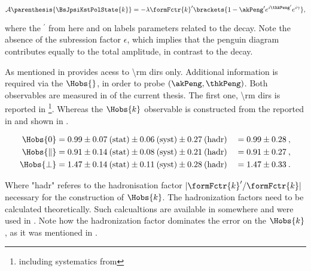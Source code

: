 \begin{equation}
  \mathcal{A} \parenthesis{\BsJpsiKstPolState{k}} = -\lambda \formFctr{k}' \brackets{ 1 - \akPeng' e^{i\thkPeng'} e^{i\gamma} },
  \label{bsjpsikst_amp}
\end{equation}

\noindent where the ${}^\prime$ from here and on labels parameters related to the \BsJpsiKst decay. Note the absence of the
subression factor $\epsilon$, which implies that the penguin diagram contributes equally to the total amplitude, in contrast
to the \BsJpsiPhi decay.

As mentioned in  \BsJpsiKst provides acess to \Acp{\rm dir} only. Additional information is required via the $\Hobs{}$,
in order to probe $(\akPeng,\thkPeng)$. Both observables are measured in  of the current thesis.
The first one, \Acp{\rm dir} is reported in \footnote{including systematics from }.
Whereas the $\Hobs{k}$ observable is constructed from the \BRof{\BsJpsiKst} reported in  and shown in .

\begin{alignat}{2}
  \Hobs{0}         & = 0.99 \pm 0.07\:\text{(stat)} \pm 0.06\:\text{(syst)} \pm 0.27\:(\text{hadr}) && = 0.99 \pm 0.28\:,\\
  \Hobs{\parallel} & = 0.91 \pm 0.14\:\text{(stat)} \pm 0.08\:\text{(syst)} \pm 0.21\:(\text{hadr}) && = 0.91 \pm 0.27\:,\\
  \Hobs{\perp}     & = 1.47 \pm 0.14\:\text{(stat)} \pm 0.11\:\text{(syst)} \pm 0.28\:(\text{hadr}) && = 1.47 \pm 0.33\:.
  \label{hobs_jpsikst}
\end{alignat}

\noindent Where "hadr" referes to the hadronisation factor $|\formFctr{k}'/\formFctr{k}|$ necessary for the construction of $\Hobs{k}$.
The hadronization factors need to be calculated theoretically. Such calcualtions are available in {\color{red} somewhere} and were
used in . Note how the hadronization factor dominates the error on the $\Hobs{k}$, as it was mentioned in .

